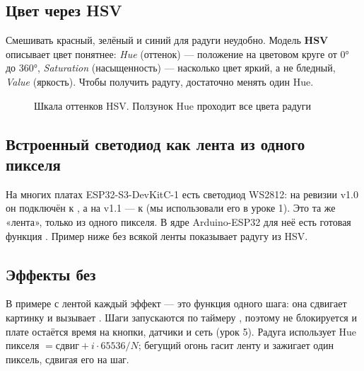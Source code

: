 \subsection{Цвет через HSV}

Смешивать красный, зелёный и синий для радуги неудобно. Модель \textbf{HSV} описывает цвет понятнее:
\emph{Hue} (оттенок) --- положение на цветовом круге от 0° до 360°, \emph{Saturation} (насыщенность) ---
насколько цвет яркий, а не бледный, \emph{Value} (яркость). Чтобы получить радугу, достаточно менять один
Hue.

\begin{figure}[H]
\centering
{}
\caption{Шкала оттенков HSV. Ползунок Hue проходит все цвета радуги}
\end{figure}

\subsection{Встроенный светодиод как лента из одного пикселя}

На многих платах ESP32-S3-DevKitC-1 есть светодиод WS2812: на ревизии v1.0 он подключён к , а
на v1.1 --- к  (мы использовали его в уроке 1). Это та же «лента», только из одного пикселя.
В ядре Arduino-ESP32 для неё есть готовая функция . Пример ниже без
всякой ленты показывает радугу из HSV.


\subsection{Эффекты без }

В примере с лентой каждый эффект --- это функция одного шага: она сдвигает картинку и вызывает
. Шаги запускаются по таймеру , поэтому  не блокируется и
плате остаётся время на кнопки, датчики и сеть (урок 5).
Радуга использует Hue пикселя $= \text{сдвиг} + i\cdot65536/N$; бегущий огонь гасит ленту и зажигает один
пиксель, сдвигая его на шаг.

